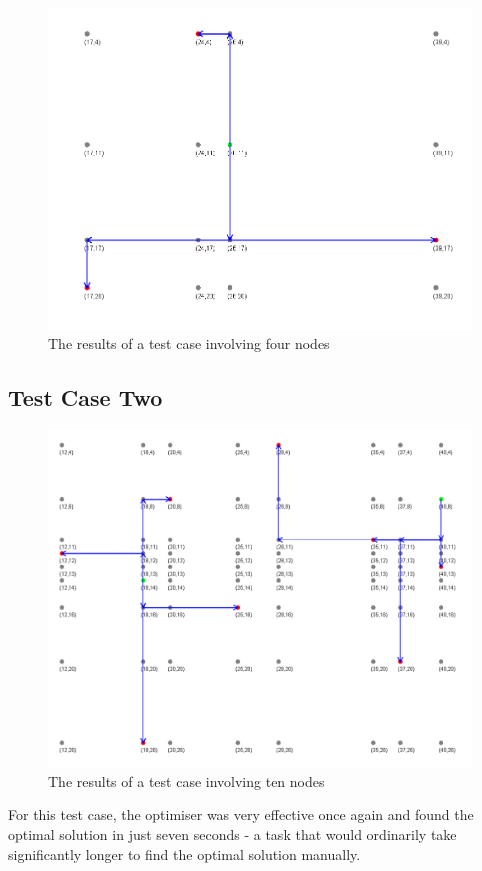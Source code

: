 \begin{figure}[H]
    \centering
    \includegraphics[width=1.0\linewidth]{resultstest2.png}
    \caption{The results of a test case involving four nodes}
    \label{fig:testcase1results}
\end{figure}

\subsection{Test Case Two}

\begin{figure}[H]
    \centering
    \includegraphics[width=0.9\linewidth]{resultstest3.png}
    \caption{The results of a test case involving ten nodes}
    \label{fig:testcase2results}
\end{figure}
For this test case, the optimiser was very effective once again and found the optimal solution in just seven seconds - a task that would ordinarily take significantly longer to find the optimal solution manually.

